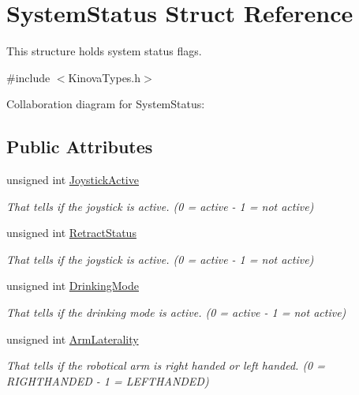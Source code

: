 \hypertarget{struct_system_status}{}\section{System\+Status Struct Reference}
\label{struct_system_status}


This structure holds system status flags.  




{\ttfamily \#include $<$Kinova\+Types.\+h$>$}



Collaboration diagram for System\+Status\+:
\subsection*{Public Attributes}
\begin{DoxyCompactItemize}
\item 
unsigned int \hyperlink{struct_system_status_afff6d14c02523d89ba0fdc22c8a8825f}{Joystick\+Active}
\begin{DoxyCompactList}\small\item\em That tells if the joystick is active. (0 = active -\/ 1 = not active) \end{DoxyCompactList}\item 
unsigned int \hyperlink{struct_system_status_abae94c0687a083017956476f140ad34d}{Retract\+Status}
\begin{DoxyCompactList}\small\item\em That tells if the joystick is active. (0 = active -\/ 1 = not active) \end{DoxyCompactList}\item 
unsigned int \hyperlink{struct_system_status_a2b07e0f791db9e94312adc4f8df5f2a0}{Drinking\+Mode}
\begin{DoxyCompactList}\small\item\em That tells if the drinking mode is active. (0 = active -\/ 1 = not active) \end{DoxyCompactList}\item 
unsigned int \hyperlink{struct_system_status_a9c587e996336850e8b89b66194fa575d}{Arm\+Laterality}
\begin{DoxyCompactList}\small\item\em That tells if the robotical arm is right handed or left handed. (0 = R\+I\+G\+H\+T\+H\+A\+N\+D\+ED -\/ 1 = L\+E\+F\+T\+H\+A\+N\+D\+ED) \end{DoxyCompactList}\item 

\end{DoxyCompactItemize}
